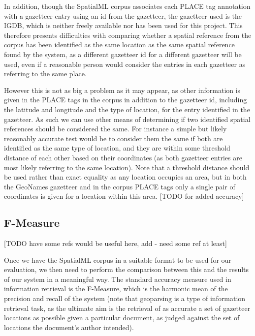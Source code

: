 \documentclass[12pt, a4paper]{report}
\begin{document}
In addition, though the SpatialML corpus associates each PLACE tag annotation with a gazetteer entry using an id from the gazetteer, the gazetteer used is the IGDB, which is neither freely available nor has been used for this project. This therefore presents difficulties with comparing whether a spatial reference from the corpus has been identified as the same location as the same spatial reference found by the system, as a different gazetteer id for a different gazetteer will be used, even if a reasonable person would consider the entries in each gazetteer as referring to the same place.

However this is not as big a problem as it may appear, as other information is given in the PLACE tags in the corpus in addition to the gazetteer id, including the latitude and longitude and the type of location, for the entry identified in the gazetteer. As such we can use other means of determining if two identified spatial references should be considered the same. For instance a simple but likely reasonably accurate test would be to consider them the same if both are identified as the same type of location, and they are within some threshold distance of each other based on their coordinates (as both gazetteer entries are most likely referring to the same location). Note that a threshold distance should be used rather than exact equality as any location occupies an area, but in both the GeoNames gazetteer and in the corpus PLACE tags only a single pair of coordinates is given for a location within this area. [TODO for added accuracy] 




\subsection{F-Measure}

[TODO have some refs would be useful here, add - need some ref at least]

Once we have the SpatialML corpus in a suitable format to be used for our evaluation, we then need to perform the comparison between this and the results of our system in a meaningful way. The standard accuracy measure used in information retrieval is the F-Measure, which is the harmonic mean of the precision and recall of the system (note that geoparsing is a type of information retrieval task, as the ultimate aim is the retrieval of as accurate a set of gazetteer locations as possible given a particular document, as judged against the set of locations the document's author intended).
\end{document}
